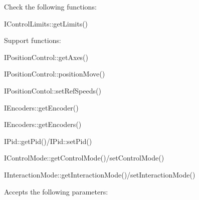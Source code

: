 Check the following functions\+: \begin{DoxyItemize}
\item I\+Control\+Limits\+::get\+Limits()\end{DoxyItemize}
Support functions\+: \begin{DoxyItemize}
\item I\+Position\+Control\+::get\+Axes() \item I\+Position\+Control\+::position\+Move() \item I\+Position\+Contol\+::set\+Ref\+Speeds() \item I\+Encoders\+::get\+Encoder() \item I\+Encoders\+::get\+Encoders() \item I\+Pid\+::get\+Pid()/\+I\+Pid\+::set\+Pid() \item I\+Control\+Mode\+::get\+Control\+Mode()/set\+Control\+Mode() \item I\+Interaction\+Mode\+::get\+Interaction\+Mode()/set\+Interaction\+Mode()\end{DoxyItemize}
Accepts the following parameters\+: \tabulinesep=1mm
